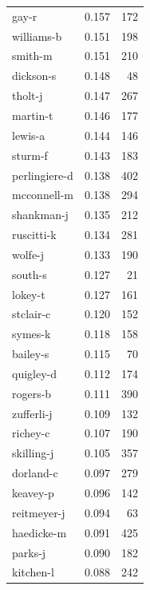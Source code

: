 \documentclass{vldb}
\begin{document}
\begin{appendix}
\begin{supertabular}{ l r r }
gay-r          &                 0.157 &     172 \\
williams-b     &                 0.151 &     198 \\
smith-m        &                 0.151 &     210 \\
dickson-s      &                 0.148 &      48 \\
tholt-j        &                 0.147 &     267 \\
martin-t       &                 0.146 &     177 \\
lewis-a        &                 0.144 &     146 \\
sturm-f        &                 0.143 &     183 \\
perlingiere-d  &                 0.138 &     402 \\
mcconnell-m    &                 0.138 &     294 \\
shankman-j     &                 0.135 &     212 \\
ruscitti-k     &                 0.134 &     281 \\
wolfe-j        &                 0.133 &     190 \\
south-s        &                 0.127 &      21 \\
lokey-t        &                 0.127 &     161 \\
stclair-c      &                 0.120 &     152 \\
symes-k        &                 0.118 &     158 \\
bailey-s       &                 0.115 &      70 \\
quigley-d      &                 0.112 &     174 \\
rogers-b       &                 0.111 &     390 \\
zufferli-j     &                 0.109 &     132 \\
richey-c       &                 0.107 &     190 \\
skilling-j     &                 0.105 &     357 \\
dorland-c      &                 0.097 &     279 \\
keavey-p       &                 0.096 &     142 \\
reitmeyer-j    &                 0.094 &      63 \\
haedicke-m     &                 0.091 &     425 \\
parks-j        &                 0.090 &     182 \\
kitchen-l      &                 0.088 &     242 \\

\end{supertabular}
\end{appendix}
\end{document}
